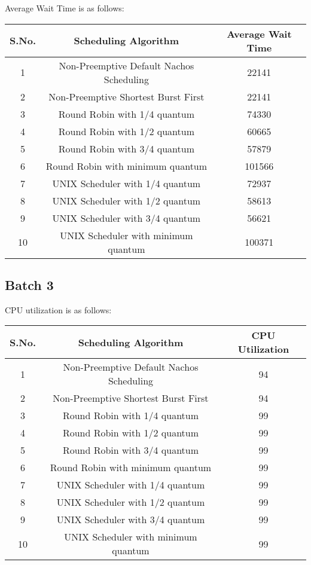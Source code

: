 \documentclass[]{article}
\begin{document}
Average Wait Time is as follows:

\begin{center}
\begin{tabular}{|c|c|c|}
\hline
S.No. & Scheduling Algorithm & Average Wait Time\\
\hline
1 & Non-Preemptive Default Nachos Scheduling & 22141\\
2 & Non-Preemptive Shortest Burst First & 22141\\
3 & Round Robin with 1/4 quantum & 74330\\
4 & Round Robin with 1/2 quantum & 60665\\
5 & Round Robin with 3/4 quantum & 57879\\
6 & Round Robin with minimum quantum & 101566\\
7 & UNIX Scheduler with 1/4 quantum & 72937\\
8 & UNIX Scheduler with 1/2 quantum & 58613\\
9 & UNIX Scheduler with 3/4 quantum & 56621\\
10 & UNIX Scheduler with minimum quantum & 100371\\
\hline
\end{tabular}
\end{center}



\subsection{Batch 3}

CPU utilization is as follows:

\begin{center}
\begin{tabular}{|c|c|c|}
\hline
S.No. & Scheduling Algorithm & CPU Utilization\\
\hline
1 & Non-Preemptive Default Nachos Scheduling & 94\\
2 & Non-Preemptive Shortest Burst First & 94\\
3 & Round Robin with 1/4 quantum & 99\\
4 & Round Robin with 1/2 quantum & 99\\
5 & Round Robin with 3/4 quantum & 99\\
6 & Round Robin with minimum quantum & 99\\
7 & UNIX Scheduler with 1/4 quantum & 99\\
8 & UNIX Scheduler with 1/2 quantum & 99\\
9 & UNIX Scheduler with 3/4 quantum & 99\\
10 & UNIX Scheduler with minimum quantum & 99\\
\hline
\end{tabular}
\end{center}
\end{document}
